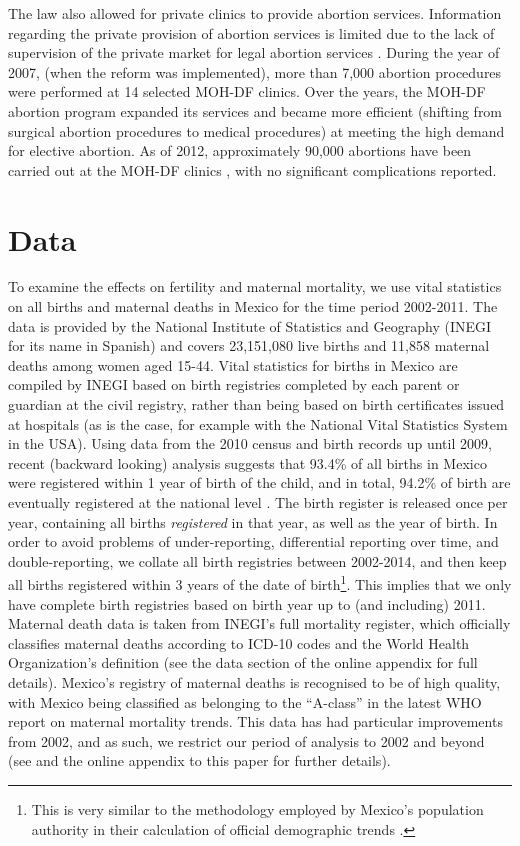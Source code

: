 \documentclass[a4paper, 11pt]{article}
\begin{document}
\begin{spacing}{2}
The law also allowed for private clinics to provide abortion services. Information regarding the private provision of abortion services is limited due to the lack of supervision of the private market for legal abortion services \citep{Becker2013}. During the year of 2007, (when the reform was implemented), more than 7,000 abortion procedures were performed at 14 selected MOH-DF clinics. Over the years, the MOH-DF abortion program expanded its services and became more efficient (shifting from surgical abortion procedures to medical procedures) at meeting the high demand for elective abortion. As of 2012, approximately 90,000 abortions have been carried out at the MOH-DF clinics \citep{Becker2013}, with no significant complications reported.

\section{Data}
\label{scn:data}
To examine the effects on fertility and maternal mortality, we use vital statistics on all births and maternal deaths in Mexico for the time period 2002-2011. The data is provided by the National Institute of Statistics and Geography (INEGI for its name in Spanish) and covers 23,151,080 live births and 11,858 maternal deaths among women aged 15-44.  Vital statistics for births in Mexico are compiled by INEGI based on birth registries completed by each parent or guardian at the civil registry, rather than being based on birth certificates issued at hospitals (as is the case, for example with the National Vital Statistics System in the USA).  Using data from the 2010 census and birth records up until 2009, recent (backward looking) analysis suggests that 93.4\% of all births in Mexico were registered within 1 year of birth of the child, and in total, 94.2\% of birth are eventually registered at the national level \citep{INEGI2012}.  The birth register is released once per year, containing all births \emph{registered} in that year, as well as the year of birth.  In order to avoid problems of under-reporting, differential reporting over time, and double-reporting, we collate all birth registries between 2002-2014, and then keep all births registered within 3 years of the date of birth\footnote{This is very similar to the methodology employed by Mexico's population authority in their calculation of official demographic trends \citep{CONAPO2012}.}.  This implies that we only have complete birth registries based on birth year up to (and including) 2011.  Maternal death data is taken from INEGI's full mortality register, which officially classifies maternal deaths according to ICD-10 codes and the World Health Organization's definition (see the data section of the online appendix for full details).  Mexico's registry of maternal deaths is recognised to be of high quality, with Mexico being classified as belonging to the ``A-class'' \citep{WHO1987} in the latest WHO report on maternal mortality trends.  This data has had particular improvements from 2002, and as such, we restrict our period of analysis to 2002 and beyond (see \citet{Schiavonetal2012} and the online appendix to this paper for further details).  


\end{spacing}
\end{document}
